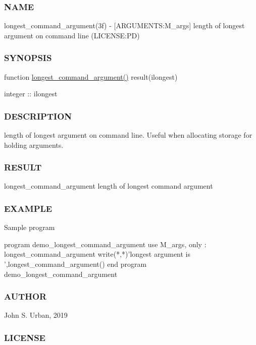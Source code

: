\subsubsection*{N\+A\+ME}

longest\+\_\+command\+\_\+argument(3f) -\/ \mbox{[}A\+R\+G\+U\+M\+E\+N\+TS\+:M\+\_\+args\mbox{]} length of longest argument on command line (L\+I\+C\+E\+N\+SE\+:PD) \subsubsection*{S\+Y\+N\+O\+P\+S\+IS}

function \mbox{\hyperlink{namespacem__cli2_a7240f12031027172b87fde623bd77958}{longest\+\_\+command\+\_\+argument()}} result(ilongest)

integer \+:\+: ilongest

\subsubsection*{D\+E\+S\+C\+R\+I\+P\+T\+I\+ON}

length of longest argument on command line. Useful when allocating storage for holding arguments. \subsubsection*{R\+E\+S\+U\+LT}

longest\+\_\+command\+\_\+argument length of longest command argument \subsubsection*{E\+X\+A\+M\+P\+LE}

Sample program \begin{DoxyVerb} program demo_longest_command_argument
 use M_args, only : longest_command_argument
    write(*,*)'longest argument is ',longest_command_argument()
 end program demo_longest_command_argument
\end{DoxyVerb}
 \subsubsection*{A\+U\+T\+H\+OR}

John S. Urban, 2019 \subsubsection*{L\+I\+C\+E\+N\+SE}

